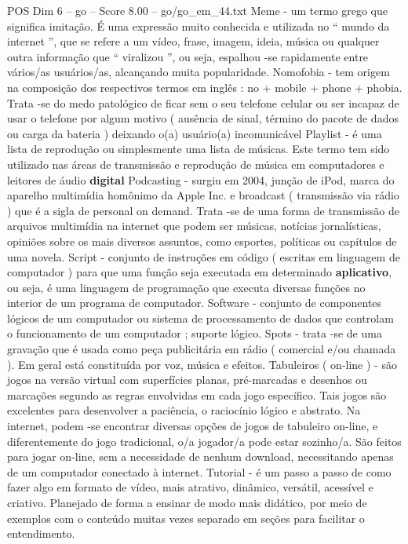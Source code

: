 \begin{textsample}{POS Dim 6 – go – Score 8.00 – go/go\_em\_44.txt}
Meme - um termo grego que significa imitação.
É uma expressão muito conhecida e utilizada no “ mundo da internet ”, que se refere a um vídeo, frase, imagem, ideia, música ou qualquer outra informação que “ viralizou ”, ou seja, espalhou -se rapidamente entre vários/as usuários/as, alcançando muita popularidade.
Nomofobia - tem origem na composição dos respectivos termos em inglês : no + mobile + phone + phobia.
Trata -se do medo patológico de ficar sem o seu telefone celular ou ser incapaz de usar o telefone por algum motivo ( ausência de sinal, término do pacote de dados ou carga da bateria ) deixando o(a) usuário(a) incomunicável Playlist - é uma lista de reprodução ou simplesmente uma lista de músicas.
Este termo tem sido utilizado nas áreas de transmissão e reprodução de música em computadores e leitores de áudio \textbf{digital} Podcasting - surgiu em 2004, junção de iPod, marca do aparelho multimídia homônimo da Apple Inc. e broadcast ( transmissão via rádio ) que é a sigla de personal on demand.
Trata -se de uma forma de transmissão de arquivos multimídia na internet que podem ser músicas, notícias jornalísticas, opiniões sobre os mais diversos assuntos, como esportes, políticas ou capítulos de uma novela.
Script - conjunto de instruções em código ( escritas em linguagem de computador ) para que uma função seja executada em determinado \textbf{aplicativo}, ou seja, é uma linguagem de programação que executa diversas funções no interior de um programa de computador.
Software - conjunto de componentes lógicos de um computador ou sistema de processamento de dados que controlam o funcionamento de um computador ; suporte lógico.
Spots - trata -se de uma gravação que é usada como peça publicitária em rádio ( comercial e/ou chamada ).
Em geral está constituída por voz, música e efeitos.
Tabuleiros ( on-line ) - são jogos na versão virtual com superfícies planas, pré-marcadas e desenhos ou marcações segundo as regras envolvidas em cada jogo específico.
Tais jogos são excelentes para desenvolver a paciência, o raciocínio lógico e abstrato.
Na internet, podem -se encontrar diversas opções de jogos de tabuleiro on-line, e diferentemente do jogo tradicional, o/a jogador/a pode estar sozinho/a.
São feitos para jogar on-line, sem a necessidade de nenhum download, necessitando apenas de um computador conectado à internet.
Tutorial - é um passo a passo de como fazer algo em formato de vídeo, mais atrativo, dinâmico, versátil, acessível e criativo.
Planejado de forma a ensinar de modo mais didático, por meio de exemplos com o conteúdo muitas vezes separado em seções para facilitar o entendimento.

\end{textsample}

